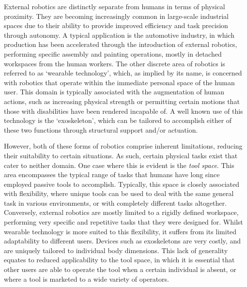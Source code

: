 \documentclass[11pt]{article}
\begin{document}
External robotics are distinctly separate from humans in terms of physical proximity. They are becoming increasingly common in large-scale industrial spaces due to their ability to provide improved efficiency and task precision through autonomy. A typical application is the automotive industry, in which production has been accelerated through the introduction of external robotics, performing specific assembly and painting operations, mostly in detached workspaces from the human workers. The other discrete area of robotics is referred to as `wearable technology', which, as implied by its name, is concerned with robotics that operate within the immediate personal space of the human user. This domain is typically associated with the augmentation of human actions, such as increasing physical strength or permitting certain motions that those with disabilities have been rendered incapable of. A well known use of this technology is the `exoskeleton', which can be tailored to accomplish either of these two functions through structural support and/or actuation.

However, both of these forms of robotics comprise inherent limitations, reducing their suitability to certain situations. As such, certain physical tasks exist that cater to neither domain. One case where this is evident is the \textit{tool space}. This area encompasses the typical range of tasks that humans have long since employed passive tools to accomplish. Typically, this space is closely associated with flexibility, where unique tools can be used to deal with the same general task in various environments, or with completely different tasks altogether. Conversely, external robotics are mostly limited to a rigidly defined workspace, performing very specific and repetitive tasks that they were designed for. Whilst wearable technology is more suited to this flexibility, it suffers from its limited adaptability to different users. Devices such as exoskeletons are very costly, and are uniquely tailored to individual body dimensions. This lack of generality equates to reduced applicability to the tool space, in which it is essential that other users are able to operate the tool when a certain individual is absent, or where a tool is marketed to a wide variety of operators.
\end{document}
